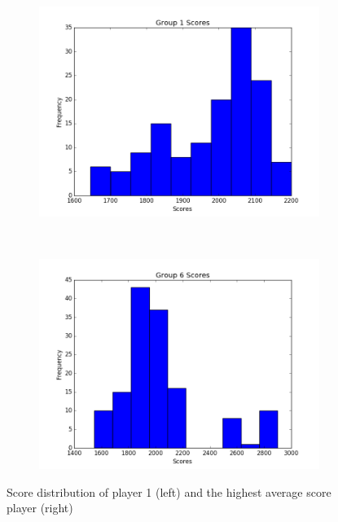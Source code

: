 \documentclass{beamer}
\begin{document}
\begin{frame}
  \begin{figure}[ht]
\centering
\begin{subfigure}[t]{.45\textwidth}
\centering
\includegraphics[width=\textwidth]{Histograms/g1.png}
\end{subfigure}
~
\begin{subfigure}[t]{.45\textwidth}
\centering
\includegraphics[width=\textwidth]{Histograms/g6.png}
\end{subfigure}
\caption{Score distribution of player 1 (left) and the highest average score player (right)}\label{fig:scores}
\end{figure}
\end{frame}
\end{document}
